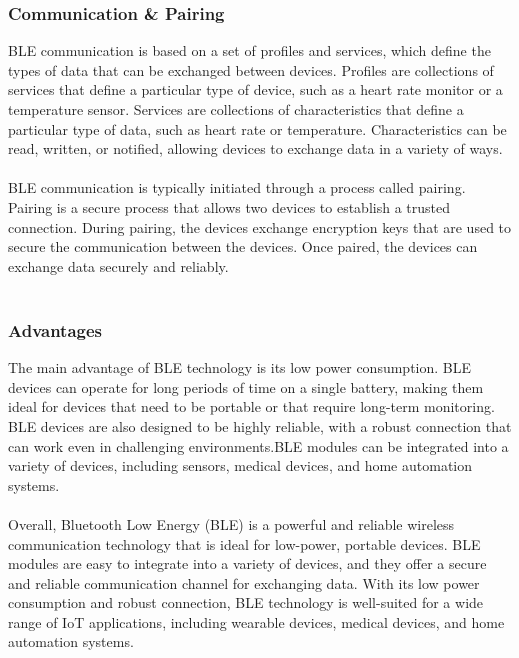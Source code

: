 \documentclass[12pt]{article}
\begin{document}
\subsubsection{Communication & Pairing}
BLE communication is based on a set of profiles and services, which define the types of data that can be exchanged between devices. Profiles are collections of services that define a particular type of device, such as a heart rate monitor or a temperature sensor. Services are collections of characteristics that define a particular type of data, such as heart rate or temperature. Characteristics can be read, written, or notified, allowing devices to exchange data in a variety of ways.
\\
\\
BLE communication is typically initiated through a process called pairing. Pairing is a secure process that allows two devices to establish a trusted connection. During pairing, the devices exchange encryption keys that are used to secure the communication between the devices. Once paired, the devices can exchange data securely and reliably.
\\
\\
\subsubsection{Advantages}
The main advantage of BLE technology is its low power consumption. BLE devices can operate for long periods of time on a single battery, making them ideal for devices that need to be portable or that require long-term monitoring. BLE devices are also designed to be highly reliable, with a robust connection that can work even in challenging environments.BLE modules can be integrated into a variety of devices, including sensors, medical devices, and home automation systems.
\\
\\
Overall, Bluetooth Low Energy (BLE) is a powerful and reliable wireless communication technology that is ideal for low-power, portable devices. BLE modules are easy to integrate into a variety of devices, and they offer a secure and reliable communication channel for exchanging data. With its low power consumption and robust connection, BLE technology is well-suited for a wide range of IoT applications, including wearable devices, medical devices, and home automation systems.
\\
\\
\end{document}
